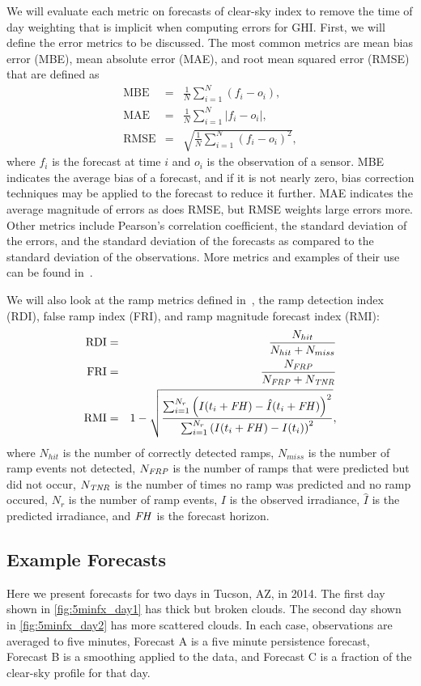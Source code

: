 We will evaluate each metric on forecasts of clear-sky index to remove
the time of day weighting that is implicit when computing errors for
GHI.
First, we will define the error metrics to be discussed.
The most common metrics are mean bias error (MBE), mean absolute error
(MAE), and root mean squared error (RMSE) that are defined as
\begin{eqnarray}
\mbox{MBE} &=& \frac{1}{N} \sum_{i=1}^N (f_i - o_i), \\
\mbox{MAE} &=& \frac{1}{N} \sum_{i=1}^N |f_i - o_i|, \\
\mbox{RMSE} &=& \sqrt{\frac{1}{N} \sum_{i=1}^N (f_i - o_i)^2},
\end{eqnarray}
where $f_i$ is the forecast at time $i$ and $o_i$ is the observation
of a sensor.
MBE indicates the average bias of a forecast, and if it is not nearly
zero, bias correction techniques may be applied to the forecast to
reduce it further.
MAE indicates the average magnitude of errors as does RMSE, but RMSE
weights large errors more.
Other metrics include Pearson's correlation coefficient, the standard
deviation of the errors, and the standard deviation of the forecasts
as compared to the standard deviation of the observations.
More metrics and examples of their use can be found
in~\cite{Zhang2015,Jensen2016}.

We will also look at the ramp metrics defined in~\cite{Chu2015b}, the
ramp detection index (RDI), false ramp index (FRI), and ramp
magnitude forecast index (RMI):
\begin{eqnarray}
\mbox{RDI} &=& \frac{N_{hit}}{N_{hit} + N_{miss}}\\
\mbox{FRI} &=& \frac{N_{\text{\em FRP\/}}}{N_\text{\em FRP\/} +
               N_\text{\em TNR\/}}\\
\mbox{RMI} &=& 1 - \sqrt{\frac{\sum_{i=1}^{N_r} \left( I(t_i + \text{\em FH\/}) -
               \hat{I}(t_i + \text{\em FH\/}) \right)^2}{\sum_{i=1}^{N_r}\left( I(t_i
               + \text{\em FH\/}) - I(t_i) \right)^2}},
\end{eqnarray}
where $N_{hit}$ is the number of correctly detected ramps, $N_{miss}$
is the number of ramp events not detected, $N_\text{\em FRP}$ is the
number of ramps that were predicted but did not occur, $N_\text{\em
TNR}$ is the number of times no ramp was predicted and no ramp
occured, $N_r$ is the number of ramp events, $I$ is the observed
irradiance, $\hat{I}$ is the predicted irradiance, and $\text{\em
FH\/}$ is the forecast horizon.

\subsection{Example Forecasts}
Here we present forecasts for two days in Tucson, AZ, in 2014.
The first day shown in \cref{fig:5minfx_day1} has thick but broken
clouds.
The second day shown in \cref{fig:5minfx_day2} has more scattered
clouds.
In each case, observations are averaged to five minutes, Forecast A is
a five minute persistence forecast, Forecast B is a smoothing applied
to the data, and Forecast C is a fraction of the clear-sky profile for
that day.

